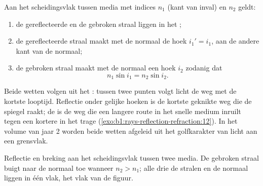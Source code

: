 \begin{theorem}\label{thm:b1:rays-reflection-refraction:snell}
Aan het scheidingsvlak tussen media met indices $n_1$ (kant van inval) en
$n_2$ geldt:
\begin{enumerate}
  \item de gereflecteerde en de gebroken straal liggen in het ;
  \item de gereflecteerde straal maakt met de normaal de hoek $i_1' = i_1$,
        aan de andere kant van de normaal;
  \item de gebroken straal maakt met de normaal een hoek $i_2$ zodanig dat
        \[
        n_1 \sin i_1 = n_2 \sin i_2 .
        \]
\end{enumerate}
\end{theorem}
\admitted

\begin{remark}\label{rem:b1:rays-reflection-refraction:fermat}
Beide wetten volgen uit het \emph{}: tussen twee punten
volgt licht de weg met de kortste looptijd. Reflectie onder gelijke hoeken is
de kortste geknikte weg die de spiegel raakt; de  is de weg
die een langere route in het snelle medium inruilt tegen een kortere in het
trage (\cref{exo:b1:rays-reflection-refraction:12}). In het volume van jaar 2
worden beide wetten afgeleid uit het golfkarakter van licht aan een grensvlak.
\end{remark}

\begin{omfigure}

{\small Reflectie en breking aan het scheidingsvlak tussen twee media.
De gebroken straal buigt naar de normaal toe wanneer $n_2 > n_1$; alle drie
de stralen en de normaal liggen in één vlak, het vlak van de figuur.}
\end{omfigure}

